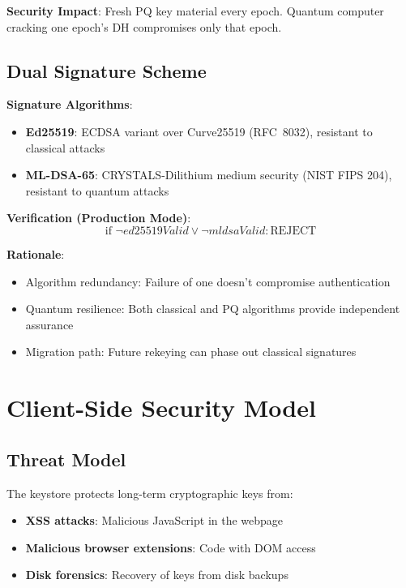 \documentclass[11pt,a4paper,oneside]{article}
\begin{document}
\textbf{Security Impact}: Fresh PQ key material every epoch. Quantum computer cracking one epoch's DH compromises only that epoch.

\subsection{Dual Signature Scheme}

\textbf{Signature Algorithms}:
\begin{itemize}
\item \textbf{Ed25519}: ECDSA variant over Curve25519 (RFC~8032), resistant to classical attacks
\item \textbf{ML-DSA-65}: CRYSTALS-Dilithium medium security (NIST FIPS 204), resistant to quantum attacks
\end{itemize}

\textbf{Verification (Production Mode)}:
\begin{equation}
\text{if } \neg ed25519Valid \lor \neg mldsaValid: \text{REJECT}
\end{equation}

\textbf{Rationale}:
\begin{itemize}
\item Algorithm redundancy: Failure of one doesn't compromise authentication
\item Quantum resilience: Both classical and PQ algorithms provide independent assurance
\item Migration path: Future rekeying can phase out classical signatures
\end{itemize}

\section{Client-Side Security Model}

\subsection{Threat Model}

The keystore protects long-term cryptographic keys from:
\begin{itemize}
\item \textbf{XSS attacks}: Malicious JavaScript in the webpage
\item \textbf{Malicious browser extensions}: Code with DOM access
\item \textbf{Disk forensics}: Recovery of keys from disk backups
\end{itemize}
\end{document}
